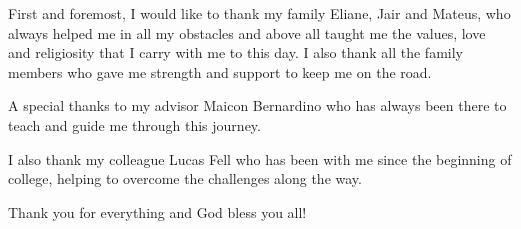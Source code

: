 \begin{agradecimentos}

First and foremost, I would like to thank my family Eliane, Jair and Mateus, who always helped me in all my obstacles and above all taught me the values, love and religiosity that I carry with me to this day. I also thank all the family members who gave me strength and support to keep me on the road.

A special thanks to my advisor Maicon Bernardino who has always been there to teach and guide me through this journey.

I also thank my colleague Lucas Fell who has been with me since the beginning of college, helping to overcome the challenges along the way.

Thank you for everything and God bless you all!

\end{agradecimentos}